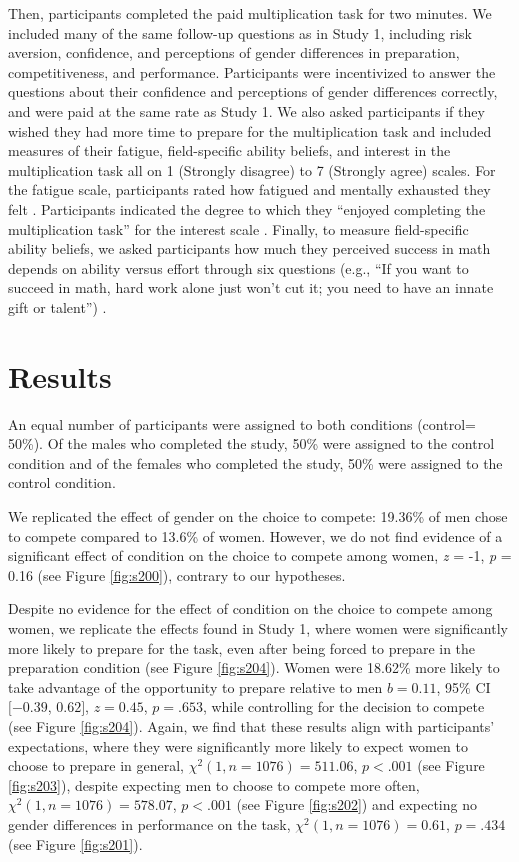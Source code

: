 \documentclass[a4paper, nobind]{templates/ociamthesis}
\begin{document}
Then, participants completed the paid multiplication task for two minutes. We included many of the same follow-up questions as in Study 1, including risk aversion, confidence, and perceptions of gender differences in preparation, competitiveness, and performance. Participants were incentivized to answer the questions about their confidence and perceptions of gender differences correctly, and were paid at the same rate as Study 1. We also asked participants if they wished they had more time to prepare for the multiplication task and included measures of their fatigue, field-specific ability beliefs, and interest in the multiplication task all on 1 (Strongly disagree) to 7 (Strongly agree) scales. For the fatigue scale, participants rated how fatigued and mentally exhausted they felt \autocite{Milyavskaya2018}. Participants indicated the degree to which they ``enjoyed completing the multiplication task'' for the interest scale \autocite{Milyavskaya2018}. Finally, to measure field-specific ability beliefs, we asked participants how much they perceived success in math depends on ability versus effort through six questions (e.g., ``If you want to succeed in math, hard work alone just won't cut it; you need to have an innate gift or talent'') \autocite{Meyer2015}.

\hypertarget{results-1}{%
\section{Results}\label{results-1}}

An equal number of participants were assigned to both conditions (control= 50\%). Of the males who completed the study, 50\% were assigned to the control condition and of the females who completed the study, 50\% were assigned to the control condition.

We replicated the effect of gender on the choice to compete: 19.36\% of men chose to compete compared to 13.6\% of women. However, we do not find evidence of a significant effect of condition on the choice to compete among women, \emph{z} = -1, \emph{p} = 0.16 (see Figure \ref{fig:s200}), contrary to our hypotheses.

Despite no evidence for the effect of condition on the choice to compete among women, we replicate the effects found in Study 1, where women were significantly more likely to prepare for the task, even after being forced to prepare in the preparation condition (see Figure \ref{fig:s204}). Women were 18.62\% more likely to take advantage of the opportunity to prepare relative to men \(b = 0.11\), 95\% CI \([-0.39\), \(0.62]\), \(z = 0.45\), \(p = .653\), while controlling for the decision to compete (see Figure \ref{fig:s204}). Again, we find that these results align with participants' expectations, where they were significantly more likely to expect women to choose to prepare in general, \(\chi^2(1, n = 1076) = 511.06\), \(p < .001\) (see Figure \ref{fig:s203}), despite expecting men to choose to compete more often, \(\chi^2(1, n = 1076) = 578.07\), \(p < .001\) (see Figure \ref{fig:s202}) and expecting no gender differences in performance on the task, \(\chi^2(1, n = 1076) = 0.61\), \(p = .434\) (see Figure \ref{fig:s201}).
\end{document}
